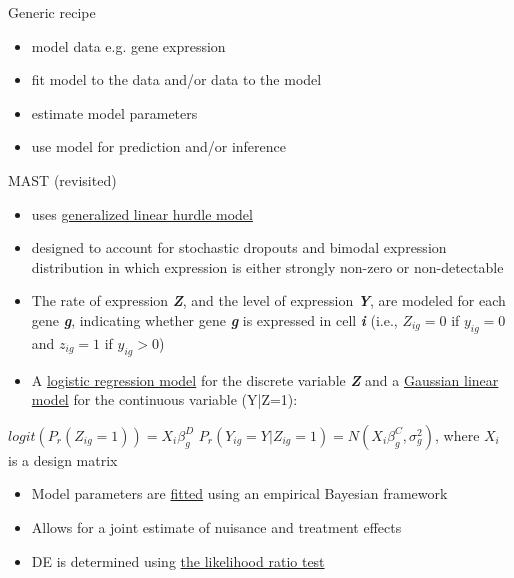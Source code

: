\documentclass{beamer}\usepackage[]{graphicx}\usepackage[]{color}
\begin{document}
\begin{frame}
\begin{block}{Generic recipe}
\begin{itemize}
\item model data e.g. gene expression
\item fit model to the data and/or data to the model
\item estimate model parameters
\item use model for prediction and/or inference
\end{itemize}
\end{block}
\end{frame}

\begin{frame}
\begin{block}{MAST (revisited)}
\vspace{0.5cm}
\scriptsize
\begin{itemize}
  \item uses \underline{generalized linear hurdle model}
  \item designed to account for stochastic dropouts and bimodal expression distribution in which expression is either strongly non-zero or non-detectable
  \item The rate of expression \textbf{\textit{Z}}, and the level of expression \textbf{\textit{Y}}, are modeled for each gene \textbf{\textit{g}}, indicating whether gene \textbf{\textit{g}} is expressed in cell \textbf{\textit{i}} (i.e., $Z_{ig}=0$ if $y_{ig}=0$ and $z_{ig}=1$ if $y_{ig}>0$)
  \item A \underline{logistic regression model} for the discrete variable \textbf{\textit{Z}} and a \underline{Gaussian linear model} for the continuous variable (Y|Z=1):
   \end{itemize}
   \begin{center}
    $logit (P_r(Z_{ig}=1))=X_i\beta_g^D$ \newline
    $P_r(Y_{ig}=Y|Z_{ig}=1)=N(X_i\beta_g^C,\sigma_g^2)$, where $X_i$ is a design matrix
\end{center}
\begin{itemize}
\item Model parameters are \underline{fitted} using an empirical Bayesian framework
\item Allows for a joint estimate of nuisance and treatment effects
\item DE is determined using \underline{the likelihood ratio test}
\end{itemize}
\end{block}
\end{frame}
\end{document}
